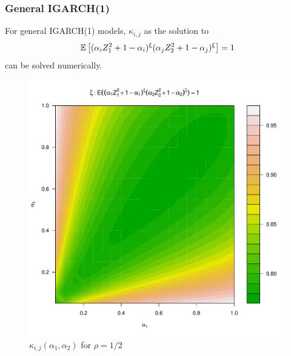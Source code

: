 \documentclass{beamer}
\begin{document}
\begin{frame}
  \frametitle{General IGARCH(1)}
  For general IGARCH(1) models, $\kappa_{i,j}$ as the solution to
  \begin{equation*}
    \mathbb{E} \left[
      (
      \alpha_i Z_1^2 + 1 - \alpha_i
      )^\xi
      (
      \alpha_j Z_2^2 + 1 - \alpha_j
      )^\xi\right] = 1
  \end{equation*}
  can be solved numerically.
  \begin{figure}[htb!]
    \centering
    \includegraphics[scale=0.3]{igarch_rho0dot5.pdf}
    \caption{$\kappa_{i,j}(\alpha_1, \alpha_2)$ for $\rho = 1/2$}
    \label{fig:xi_rho0.5}
  \end{figure}
\end{frame}
\end{document}
